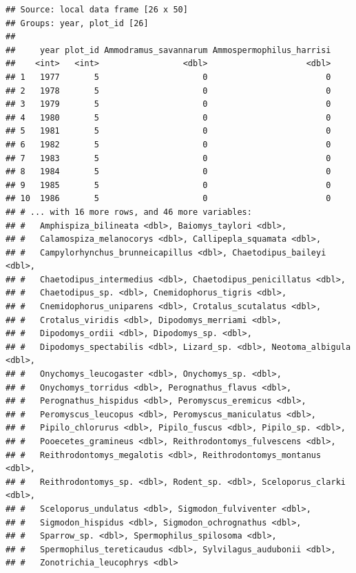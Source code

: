 \documentclass[]{article}
\begin{document}
\begin{verbatim}
## Source: local data frame [26 x 50]
## Groups: year, plot_id [26]
## 
##     year plot_id Ammodramus_savannarum Ammospermophilus_harrisi
##    <int>   <int>                 <dbl>                    <dbl>
## 1   1977       5                     0                        0
## 2   1978       5                     0                        0
## 3   1979       5                     0                        0
## 4   1980       5                     0                        0
## 5   1981       5                     0                        0
## 6   1982       5                     0                        0
## 7   1983       5                     0                        0
## 8   1984       5                     0                        0
## 9   1985       5                     0                        0
## 10  1986       5                     0                        0
## # ... with 16 more rows, and 46 more variables:
## #   Amphispiza_bilineata <dbl>, Baiomys_taylori <dbl>,
## #   Calamospiza_melanocorys <dbl>, Callipepla_squamata <dbl>,
## #   Campylorhynchus_brunneicapillus <dbl>, Chaetodipus_baileyi <dbl>,
## #   Chaetodipus_intermedius <dbl>, Chaetodipus_penicillatus <dbl>,
## #   Chaetodipus_sp. <dbl>, Cnemidophorus_tigris <dbl>,
## #   Cnemidophorus_uniparens <dbl>, Crotalus_scutalatus <dbl>,
## #   Crotalus_viridis <dbl>, Dipodomys_merriami <dbl>,
## #   Dipodomys_ordii <dbl>, Dipodomys_sp. <dbl>,
## #   Dipodomys_spectabilis <dbl>, Lizard_sp. <dbl>, Neotoma_albigula <dbl>,
## #   Onychomys_leucogaster <dbl>, Onychomys_sp. <dbl>,
## #   Onychomys_torridus <dbl>, Perognathus_flavus <dbl>,
## #   Perognathus_hispidus <dbl>, Peromyscus_eremicus <dbl>,
## #   Peromyscus_leucopus <dbl>, Peromyscus_maniculatus <dbl>,
## #   Pipilo_chlorurus <dbl>, Pipilo_fuscus <dbl>, Pipilo_sp. <dbl>,
## #   Pooecetes_gramineus <dbl>, Reithrodontomys_fulvescens <dbl>,
## #   Reithrodontomys_megalotis <dbl>, Reithrodontomys_montanus <dbl>,
## #   Reithrodontomys_sp. <dbl>, Rodent_sp. <dbl>, Sceloporus_clarki <dbl>,
## #   Sceloporus_undulatus <dbl>, Sigmodon_fulviventer <dbl>,
## #   Sigmodon_hispidus <dbl>, Sigmodon_ochrognathus <dbl>,
## #   Sparrow_sp. <dbl>, Spermophilus_spilosoma <dbl>,
## #   Spermophilus_tereticaudus <dbl>, Sylvilagus_audubonii <dbl>,
## #   Zonotrichia_leucophrys <dbl>
\end{verbatim}
\end{document}
